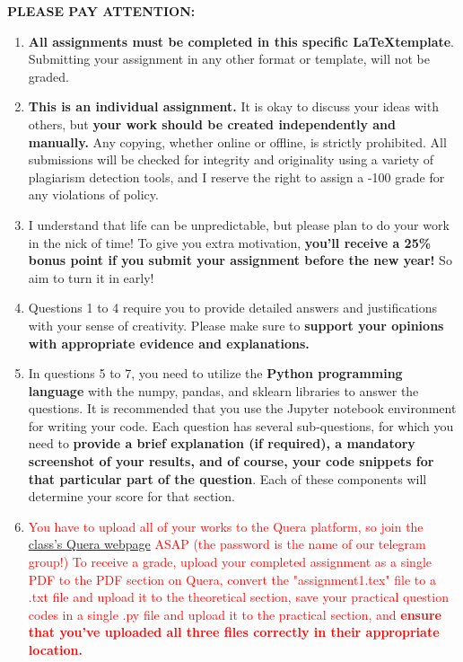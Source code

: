 
\mdfdefinestyle{MyFrame}{%
	linecolor=black,
	outerlinewidth=2pt,
	innertopmargin=4pt,
	innerbottommargin=4pt,
	innerrightmargin=4pt,
	innerleftmargin=4pt,
	leftmargin = 4pt,
	rightmargin = 4pt
}



    
    \toc
    
\begin{mdframed}[style=MyFrame,nobreak=true,align=center,userdefinedwidth=40em,backgroundcolor=blue!20]
	\textbf{PLEASE PAY ATTENTION:}
	\begin{enumerate}
		\item \textbf{All assignments must be completed in this specific \LaTeX template}. Submitting your assignment in any other format or template, will not be graded.
		\item \textbf{This is an individual assignment.} It is okay to discuss your ideas with others, but \textbf{your work should be created independently and manually.} Any copying, whether online or offline, is strictly prohibited. All submissions will be checked for integrity and originality using a variety of plagiarism detection tools, and I reserve the right to assign a -100 grade for any violations of policy.
		\item I understand that life can be unpredictable, but please plan to do your work in the nick of time!
		To give you extra motivation, \textbf{you'll receive a 25\% bonus point if you submit your assignment before the new year!} So aim to turn it in early!
		\item Questions 1 to 4 require you to provide detailed answers and justifications with your sense of creativity. Please make sure to \textbf{support your opinions with appropriate evidence and explanations.}
		\item In questions 5 to 7, you need to utilize the \textbf{Python programming language} with the numpy, pandas, and sklearn libraries to answer the questions. It is recommended that you use the Jupyter notebook environment for writing your code. Each question has several sub-questions, for which you need to \textbf{provide a brief explanation (if required), a mandatory screenshot of your results, and of course, your code snippets for that particular part of the question}. Each of these components will determine your score for that section.
		\item \textcolor{red}{You have to upload all of your works to the Quera platform, so join the \href{https://quera.org/course/add_to_course/course/13725/}{class's Quera webpage} ASAP (the password is the name of our telegram group!)	To receive a grade, upload your completed assignment as a single PDF to the PDF section on Quera, convert the "assignment1.tex" file to a .txt file and upload it to the theoretical section, save your practical question codes in a single .py file and upload it to the practical section, and \textbf{ensure that you've uploaded all three files correctly in their appropriate location.}}

\end{enumerate}
\end{mdframed}
